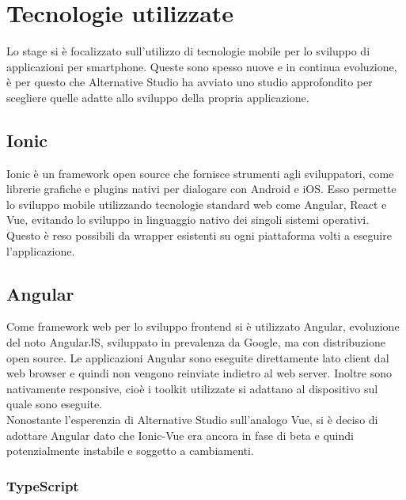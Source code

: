 
\section{Tecnologie utilizzate}

Lo stage si è focalizzato sull'utilizzo di tecnologie mobile per lo sviluppo di applicazioni per smartphone. Queste sono spesso nuove e in
continua evoluzione, è per questo che Alternative Studio ha avviato uno studio approfondito per scegliere quelle adatte allo sviluppo della
propria applicazione.

\subsection{Ionic}

Ionic è un \gls{framework} open source che fornisce strumenti agli sviluppatori, come librerie grafiche e plugins nativi per dialogare
con \gls{Android} e \gls{iOS}. Esso permette lo sviluppo mobile utilizzando tecnologie standard web come Angular, React e Vue, evitando lo
sviluppo in linguaggio nativo dei singoli sistemi operativi. Questo è reso possibili da wrapper esistenti su ogni piattaforma volti a
eseguire l'applicazione.

\subsection{Angular}

Come framework web per lo sviluppo \gls{frontend} si è utilizzato Angular, evoluzione del noto AngularJS, sviluppato in prevalenza da Google, ma con distribuzione \gls{open source}. Le applicazioni Angular sono eseguite direttamente lato client dal web browser e quindi non vengono reinviate indietro al web server. Inoltre sono nativamente responsive, cioè i toolkit utilizzate si adattano al dispositivo sul quale sono eseguite. \\
Nonostante l'esperenzia di Alternative Studio sull'analogo Vue, si è deciso di adottare Angular dato che Ionic-Vue era ancora in fase di
beta e quindi potenzialmente instabile e soggetto a cambiamenti.

\subsubsection{TypeScript}

